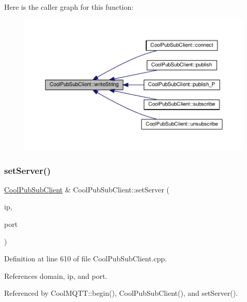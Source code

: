 Here is the caller graph for this function\+:\nopagebreak
\begin{figure}[H]
\begin{center}
\leavevmode
\includegraphics[width=350pt]{d8/d4b/class_cool_pub_sub_client_a0e3d7e776d4cf4427f9569b28868905a_icgraph}
\end{center}
\end{figure}
\mbox{\label{class_cool_pub_sub_client_a947e70c394c66c7d08d0c53caf8425e3}} 
\subsubsection{\texorpdfstring{set\+Server()}{setServer()}\hspace{0.1cm}{\footnotesize\ttfamily [1/3]}}
{\footnotesize\ttfamily \hyperlink{class_cool_pub_sub_client}{Cool\+Pub\+Sub\+Client} \& Cool\+Pub\+Sub\+Client\+::set\+Server (\begin{DoxyParamCaption}\item[{I\+P\+Address}]{ip,  }\item[{uint16\+\_\+t}]{port }\end{DoxyParamCaption})}



Definition at line 610 of file Cool\+Pub\+Sub\+Client.\+cpp.



References domain, ip, and port.



Referenced by Cool\+M\+Q\+T\+T\+::begin(), Cool\+Pub\+Sub\+Client(), and set\+Server().

